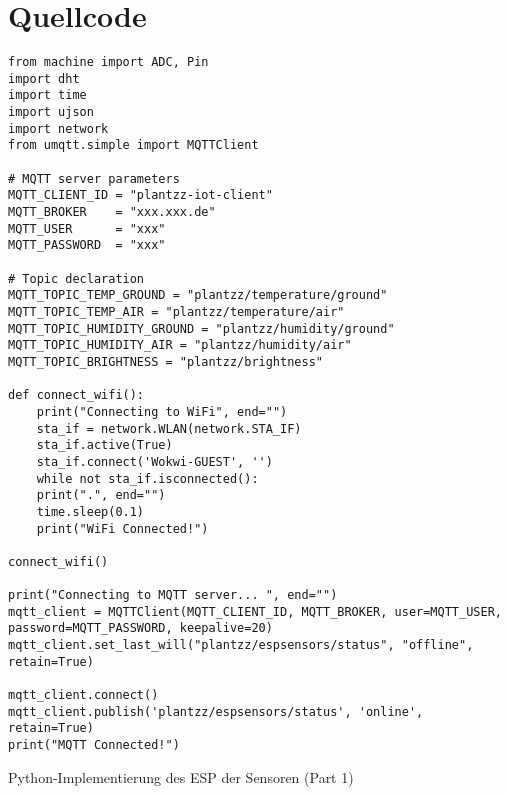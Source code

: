 
\section{Quellcode}

\begin{listing}[!ht]
\begin{verbatim}
from machine import ADC, Pin
import dht
import time
import ujson
import network
from umqtt.simple import MQTTClient 

# MQTT server parameters
MQTT_CLIENT_ID = "plantzz-iot-client"
MQTT_BROKER    = "xxx.xxx.de"
MQTT_USER      = "xxx"
MQTT_PASSWORD  = "xxx"

# Topic declaration
MQTT_TOPIC_TEMP_GROUND = "plantzz/temperature/ground"
MQTT_TOPIC_TEMP_AIR = "plantzz/temperature/air"
MQTT_TOPIC_HUMIDITY_GROUND = "plantzz/humidity/ground"
MQTT_TOPIC_HUMIDITY_AIR = "plantzz/humidity/air"
MQTT_TOPIC_BRIGHTNESS = "plantzz/brightness"

def connect_wifi():
    print("Connecting to WiFi", end="")
    sta_if = network.WLAN(network.STA_IF)
    sta_if.active(True)
    sta_if.connect('Wokwi-GUEST', '')
    while not sta_if.isconnected():
    print(".", end="")
    time.sleep(0.1)
    print("WiFi Connected!")

connect_wifi()

print("Connecting to MQTT server... ", end="")
mqtt_client = MQTTClient(MQTT_CLIENT_ID, MQTT_BROKER, user=MQTT_USER, password=MQTT_PASSWORD, keepalive=20)
mqtt_client.set_last_will("plantzz/espsensors/status", "offline", retain=True)

mqtt_client.connect()
mqtt_client.publish('plantzz/espsensors/status', 'online', retain=True)
print("MQTT Connected!")
\end{verbatim}
\caption{Python-Implementierung des ESP der Sensoren (Part 1)}
\label{list:wokwi_sensoren1}
\end{listing}

